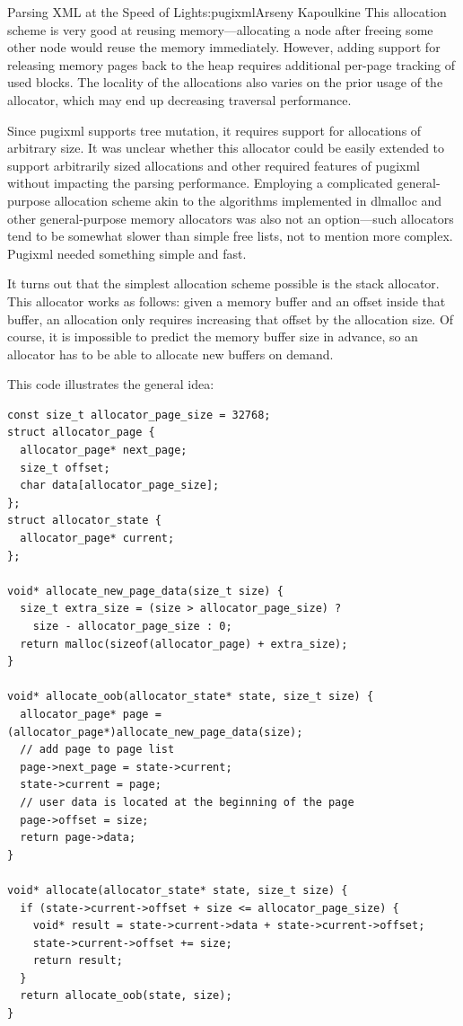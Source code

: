 \begin{aosachapter}{Parsing XML at the Speed of Light}{s:pugixml}{Arseny Kapoulkine}
This allocation scheme is very good at reusing memory---allocating a
node after freeing some other node would reuse the memory immediately.
However, adding support for releasing memory pages back to the heap
requires additional per-page tracking of used blocks. The locality of
the allocations also varies on the prior usage of the allocator, which
may end up decreasing traversal performance.

Since pugixml supports tree mutation, it requires support for
allocations of arbitrary size. It was unclear whether this allocator
could be easily extended to support arbitrarily sized allocations and
other required features of pugixml without impacting the parsing
performance. Employing a complicated general-purpose allocation scheme
akin to the algorithms implemented in dlmalloc and other general-purpose
memory allocators was also not an option---such allocators tend to be
somewhat slower than simple free lists, not to mention more complex.
Pugixml needed something simple and fast.

It turns out that the simplest allocation scheme possible is the stack
allocator. This allocator works as follows: given a memory buffer and an
offset inside that buffer, an allocation only requires increasing that
offset by the allocation size. Of course, it is impossible to predict
the memory buffer size in advance, so an allocator has to be able to
allocate new buffers on demand.

This code illustrates the general idea:

\begin{verbatim}
const size_t allocator_page_size = 32768;
struct allocator_page {
  allocator_page* next_page;
  size_t offset;
  char data[allocator_page_size];
};
struct allocator_state {
  allocator_page* current;
};

void* allocate_new_page_data(size_t size) {
  size_t extra_size = (size > allocator_page_size) ?
    size - allocator_page_size : 0;
  return malloc(sizeof(allocator_page) + extra_size);
}

void* allocate_oob(allocator_state* state, size_t size) {
  allocator_page* page = (allocator_page*)allocate_new_page_data(size);
  // add page to page list
  page->next_page = state->current;
  state->current = page;
  // user data is located at the beginning of the page
  page->offset = size;
  return page->data;
}

void* allocate(allocator_state* state, size_t size) {
  if (state->current->offset + size <= allocator_page_size) {
    void* result = state->current->data + state->current->offset;
    state->current->offset += size;
    return result;
  }
  return allocate_oob(state, size);
}
\end{verbatim}


\end{aosachapter}
